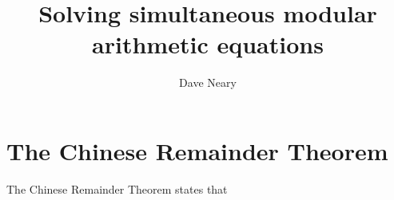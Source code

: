 \documentclass{article}
\begin{document}
\title{Solving simultaneous modular arithmetic equations}
\author{Dave Neary}

\maketitle

\section{The Chinese Remainder Theorem}

The Chinese Remainder Theorem states that 
\end{document}
